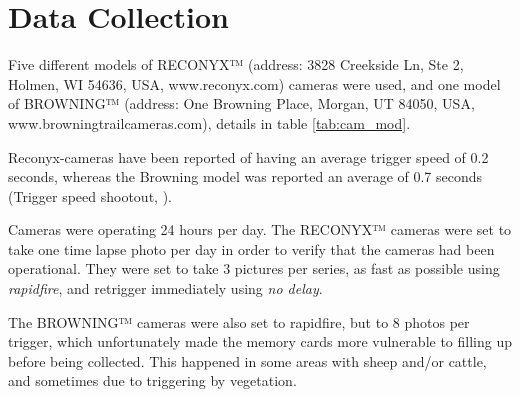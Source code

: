 



\section{Data Collection} 

Five different models of RECONYX™ (address: 3828 Creekside Ln, Ste 2, Holmen, WI 54636, USA, www.reconyx.com) cameras were used, 
and one model of BROWNING™ (address: One Browning Place, Morgan, UT 84050, USA, www.browningtrailcameras.com), details in table \ref{tab:cam_mod}.

Reconyx-cameras have been reported of having an average trigger speed of 0.2 seconds, whereas the Browning model was reported an average of 0.7 seconds (Trigger speed shootout, \cite{Trailcampro2014}).







Cameras were operating 24 hours per day. The RECONYX™ cameras were set to take one time lapse photo per day in order to verify that the cameras had been operational.
They were set to take 3 pictures per series, as fast as possible using \emph{rapidfire}, and retrigger immediately using \emph{no delay}.

The BROWNING™ cameras were also set to rapidfire, but to 8 photos per trigger, which unfortunately made the memory cards more vulnerable to filling up before being collected. This happened in some areas with sheep and/or cattle, and sometimes due to triggering by vegetation.

